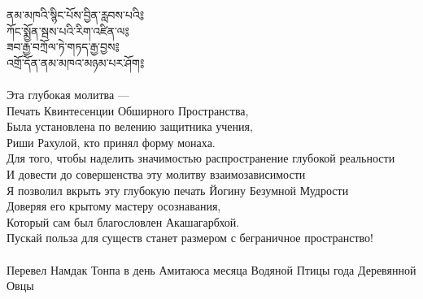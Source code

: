 ནམ་མཁའི་སྙིང་པོས་བྱིན་རླབས་པའི༔\\
ཀོང་སྨྱོན་སྦས་པའི་རིག་འཛིན་ལ༔\\
ཟབ་རྒྱ་བཀྲོལ་ཏེ་གཏད་རྒྱ་བྱས༔\\
འགྲོ་དོན་ནམ་མཁའ་མཉམ་པར་ཤོག༔\\
\\
\ru
Эта глубокая молитва —\\
Печать Квинтесенции Обширного Пространства,\\
Была установлена по велению защитника учения,\\
Риши Рахулой, кто принял форму монаха.\\
Для того, чтобы наделить значимостью распространение глубокой реальности\\
И довести до совершенства эту молитву взаимозависимости\\
Я позволил вкрыть эту глубокую печать Йогину Безумной Мудрости\\
Доверяя его крытому мастеру осознавания,\\
Который сам был благословлен Акашагарбхой.\\
Пускай польза для существ станет размером с беграничное пространство!\\
\\
\scriptsize Перевел Намдак Тонпа в день Амитаюса месяца Водяной Птицы года Деревянной Овцы\normalsize
